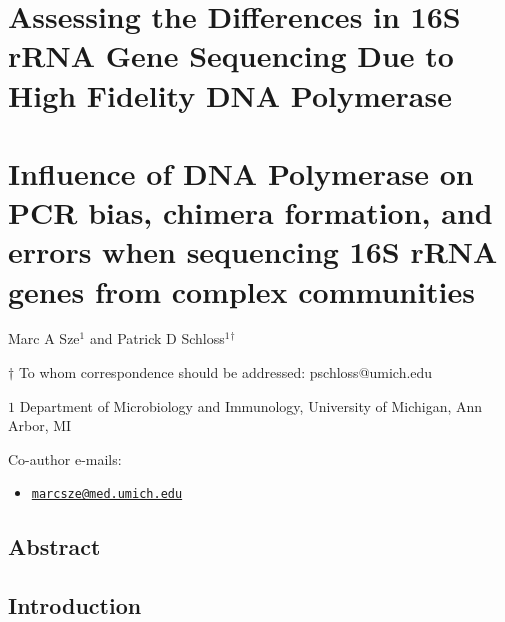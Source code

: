 \documentclass[11pt,]{article}
\title{}
\author{}
\date{}
\providecommand{\tightlist}{%
  \setlength{\itemsep}{0pt}\setlength{\parskip}{0pt}}
\begin{document}
\hypertarget{assessing-the-differences-in-16s-rrna-gene-sequencing-due-to-high-fidelity-dna-polymerase}{%
\section{Assessing the Differences in 16S rRNA Gene Sequencing Due to
High Fidelity DNA
Polymerase}\label{assessing-the-differences-in-16s-rrna-gene-sequencing-due-to-high-fidelity-dna-polymerase}}

\hypertarget{influence-of-dna-polymerase-on-pcr-bias-chimera-formation-and-errors-when-sequencing-16s-rrna-genes-from-complex-communities}{%
\section{Influence of DNA Polymerase on PCR bias, chimera formation, and
errors when sequencing 16S rRNA genes from complex
communities}\label{influence-of-dna-polymerase-on-pcr-bias-chimera-formation-and-errors-when-sequencing-16s-rrna-genes-from-complex-communities}}

\begin{center}
\vspace{25mm}

Marc A Sze${^1}$ and Patrick D Schloss${^1}$${^\dagger}$

\vspace{20mm}

$\dagger$ To whom correspondence should be addressed: pschloss@umich.edu

$1$ Department of Microbiology and Immunology, University of Michigan, Ann Arbor, MI




\end{center}

Co-author e-mails:

\begin{itemize}
\tightlist
\item
  \href{mailto:marcsze@med.umich.edu}{\nolinkurl{marcsze@med.umich.edu}}
\end{itemize}

\newpage
\linenumbers

\hypertarget{abstract}{%
\subsection{Abstract}\label{abstract}}

\newpage

\hypertarget{introduction}{%
\subsection{Introduction}\label{introduction}}
\end{document}
